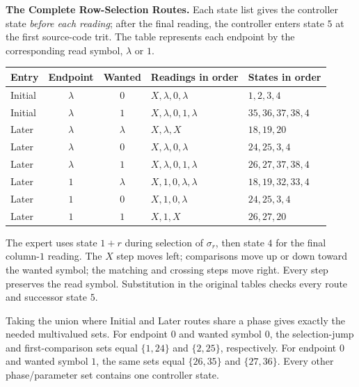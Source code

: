 \documentclass[11pt,a4paper]{article}
\newcommand{\blank}{\lambda}
\begin{document}
\textbf{The Complete Row-Selection Routes.}
Each state list gives the controller state \emph{before each reading}; after
the final reading, the controller enters state $5$ at the first source-code
trit. The table represents each endpoint by the corresponding read symbol,
$\blank$ or $1$.

\begin{center}
\small\renewcommand{\arraystretch}{1.3}\setlength{\tabcolsep}{7pt}
\begin{tabular}{l c c l l}
\toprule\rowcolor{Pale}Entry & Endpoint & Wanted & Readings in order & States in order\\\midrule
Initial & $\blank$ & $0$ & $X,\blank,0,\blank$ & $1,2,3,4$\\
Initial & $\blank$ & $1$ & $X,\blank,0,1,\blank$ & $35,36,37,38,4$\\\midrule
Later & $\blank$ & $\blank$ & $X,\blank,X$ & $18,19,20$\\
Later & $\blank$ & $0$ & $X,\blank,0,\blank$ & $24,25,3,4$\\
Later & $\blank$ & $1$ & $X,\blank,0,1,\blank$ & $26,27,37,38,4$\\
Later & $1$ & $\blank$ & $X,1,0,\blank,\blank$ & $18,19,32,33,4$\\
Later & $1$ & $0$ & $X,1,0,\blank$ & $24,25,3,4$\\
Later & $1$ & $1$ & $X,1,X$ & $26,27,20$\\
\bottomrule
\end{tabular}
\end{center}
The expert uses state $1+r$ during selection of $\sigma_r$, then state
$4$ for the final column-$1$ reading. The $X$ step moves left; comparisons move up
or down toward the wanted symbol; the matching and crossing steps move
right. Every step preserves the read symbol. Substitution in the original tables
checks every route and successor state $5$.

Taking the union where Initial and Later routes share a phase gives exactly
the needed multivalued sets. For endpoint $0$ and wanted symbol $0$, the selection-jump and first-comparison sets equal $\{1,24\}$ and
$\{2,25\}$, respectively. For endpoint $0$ and wanted symbol $1$, the same
sets equal $\{26,35\}$ and $\{27,36\}$. Every other phase/parameter set
contains one controller state.
\end{document}
